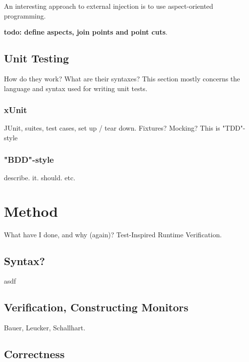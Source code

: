 \documentclass[a4paper,11pt]{kth-mag}
\newcommand{\todo}[1]{\textbf{todo: #1}}
\begin{document}
An interesting approach to external injection is to use aspect-oriented
programming.

\todo{define aspects, join points and point cuts}.


\section{Unit Testing} \label{section-unit-testing}

How do they work? What are their syntaxes? This section mostly concerns the
language and syntax used for writing unit tests.

\subsection{xUnit}

JUnit, suites, test cases, set up / tear down. Fixtures? Mocking? This is
"TDD"-style

\subsection{"BDD"-style}

describe. it. should. etc.







\pagestyle{newchap}
\chapter{Method} \label{chapter-method}

What have I done, and why (again)? Test-Inspired Runtime Verification.


\section{Syntax?}

asdf

\section{Verification, Constructing Monitors}

Bauer, Leucker, Schallhart.

\section{Correctness}
\end{document}
